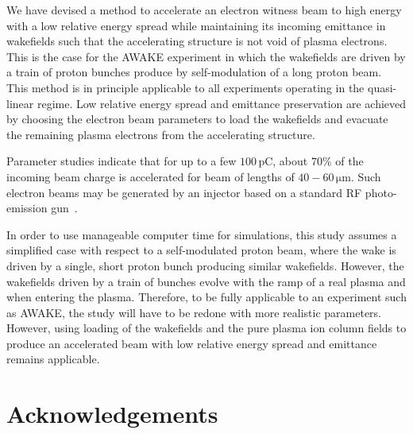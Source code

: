 \documentclass[aps,prstab,reprint,amsmath,amssymb,groupedaddress]{revtex4-1}
\newcommand{\unit}[1]{\,\mathrm{#1}}
\begin{document}

We have devised a method to accelerate an electron witness beam to high energy with a low relative energy spread while
maintaining its incoming emittance in wakefields such that the accelerating structure is not void of plasma electrons.
This is the case for the AWAKE experiment in which the wakefields are driven by a train of proton bunches produce by
self-modulation of a long proton beam. This method is in principle applicable to all experiments operating in the
quasi-linear regime. Low relative energy spread and emittance preservation are achieved by choosing the electron beam
parameters to load the wakefields and evacuate the remaining plasma electrons from the accelerating structure.
 
Parameter studies indicate that for up to a few $100\unit{pC}$, about $70\%$ of the incoming beam charge is accelerated
for beam of lengths of $40-60\unit{\mu m}$. Such electron beams may be generated by an injector based on a standard
RF photo-emission gun~\cite{doebert:corr}.

In order to use manageable computer time for simulations, this study assumes a simplified case with respect to a
self-modulated proton beam, where the wake is driven by a single, short proton bunch producing similar wakefields.
However, the wakefields driven by a train of bunches evolve with the ramp of a real plasma and when entering the plasma.
Therefore, to be fully applicable to an experiment such as AWAKE, the study will have to be redone with more realistic
parameters. However, using loading of the wakefields and the pure plasma ion column fields to produce an accelerated
beam with low relative energy spread and emittance remains applicable.

\section{Acknowledgements}\label{Ack}
\end{document}
